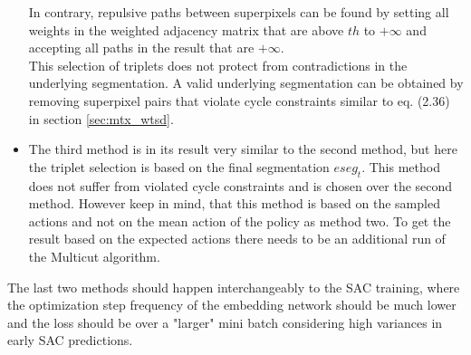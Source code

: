 \begin{itemize}
 	In contrary, repulsive paths between superpixels can be found by setting all weights in the weighted adjacency matrix that are above $th$ to $+\infty$ and accepting all paths in the result that are $+\infty$.\\
 	This selection of triplets does not protect from contradictions in the underlying segmentation. A valid underlying segmentation can be obtained by removing superpixel pairs that violate cycle constraints similar to eq. (2.36) in section \ref{sec:mtx_wtsd}.
 	\item The third method is in its result very similar to the second method, but here the triplet selection is based on the final segmentation $eseg_t$. This method does not suffer from violated cycle constraints and is chosen over the second method. However keep in mind, that this method is based on the sampled actions and not on the mean action of the policy as method two. To get the result based on the expected actions there needs to be an additional run of the Multicut algorithm.
\end{itemize}
The last two methods should happen interchangeably to the SAC training, where the optimization step frequency of the embedding network should be much lower and the loss should be over a "larger" mini batch considering high variances in early SAC predictions.